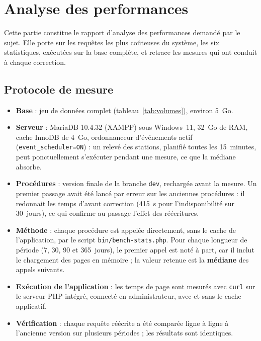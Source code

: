 \section{Analyse des performances}\label{sec:performances}

Cette partie constitue le rapport d'analyse des performances demandé par le sujet. Elle porte sur les requêtes les plus coûteuses du système, les six statistiques, exécutées sur la base complète, et retrace les mesures qui ont conduit à chaque correction.

\resultats

\subsection{Protocole de mesure}

\begin{itemize}
	\item \textbf{Base} : jeu de données complet (tableau~\ref{tab:volumes}), environ 5~Go.
	\item \textbf{Serveur} : MariaDB 10.4.32 (XAMPP) sous Windows~11, 32~Go de RAM, cache InnoDB de 4~Go, ordonnanceur d'événements actif (\texttt{event\_scheduler=ON}) : un relevé des stations, planifié toutes les 15~minutes, peut ponctuellement s'exécuter pendant une mesure, ce que la médiane absorbe.
	\item \textbf{Procédures} : version finale de la branche \texttt{dev}, rechargée avant la mesure. Un premier passage avait été lancé par erreur sur les anciennes procédures : il redonnait les temps d'avant correction (415~s pour l'indisponibilité sur 30~jours), ce qui confirme au passage l'effet des réécritures.
	\item \textbf{Méthode} : chaque procédure est appelée directement, sans le cache de l'application, par le script \texttt{bin/bench-stats.php}. Pour chaque longueur de période (7, 30, 90 et 365~jours), le premier appel est noté à part, car il inclut le chargement des pages en mémoire ; la valeur retenue est la \textbf{médiane} des appels suivants.
	\item \textbf{Exécution de l'application} : les temps de page sont mesurés avec \texttt{curl} sur le serveur PHP intégré, connecté en administrateur, avec et sans le cache applicatif.
	\item \textbf{Vérification} : chaque requête réécrite a été comparée ligne à ligne à l'ancienne version sur plusieurs périodes ; les résultats sont identiques.
\end{itemize}

